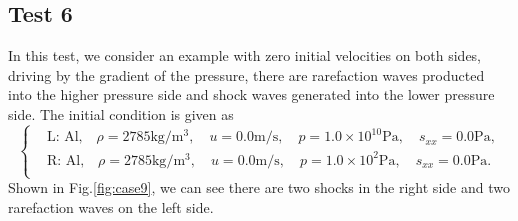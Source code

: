 \documentclass[review]{elsarticle}
\begin{document}
\subsection{Test 6}
In this test, we consider an example with zero initial velocities on both sides, driving by the gradient of the pressure, there are rarefaction waves producted into the higher pressure side and shock waves generated into the lower pressure side. The initial condition is given as
\begin{equation}
 \left\{ \begin{aligned}
	 &	 \text{L: Al,}\quad  \rho = 2785 \text{kg}/\text{m}^3, \quad  u = 0.0\text{m}/\text{s}, \quad  p = 1.0\times 10^{10} \text{Pa}, \quad s_{xx}= 0.0 \text{Pa},\\
	 &	 \text{R: Al,}\quad  \rho = 2785 \text{kg}/\text{m}^3, \quad  u = 0.0\text{m}/\text{s}, \quad  p = 1.0 \times 10^2 \text{Pa}, \quad  s_{xx}=0.0\text{Pa}.\\
   \end{aligned}
 \right.
\end{equation}
Shown in Fig.\ref{fig:case9}, we can see there are two shocks in the right side and two rarefaction waves on the left side. 
\end{document}
